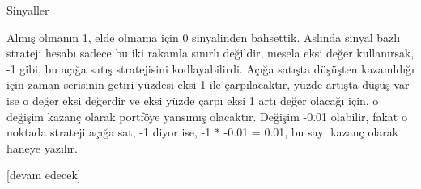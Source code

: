 \documentclass[12pt,fleqn]{article}\usepackage{../../common}
\begin{document}
Sinyaller

Almış olmanın 1, elde olmama için 0 sinyalinden bahsettik. Aslında sinyal bazlı
strateji hesabı sadece bu iki rakamla sınırlı değildir, mesela eksi değer
kullanırsak, -1 gibi, bu açığa satış stratejisini kodlayabilirdi. Açığa satışta
düşüşten kazanıldığı için zaman serisinin getiri yüzdesi eksi 1 ile
çarpılacaktır, yüzde artışta düşüş var ise o değer eksi değerdir ve eksi yüzde
çarpı eksi 1 artı değer olacağı için, o değişim kazanç olarak portföye yansımış
olacaktır. Değişim -0.01 olabilir, fakat o noktada strateji açığa sat, -1 diyor
ise, -1 * -0.01 = 0.01, bu sayı kazanç olarak haneye yazılır.















[devam edecek]
  
\end{document}
